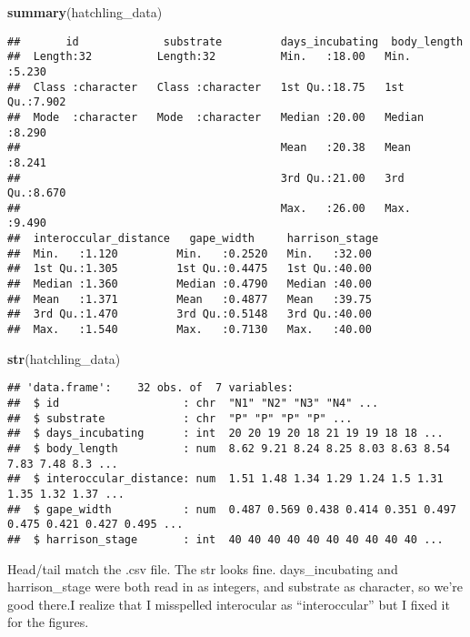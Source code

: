 \documentclass[
]{article}
\newenvironment{Shaded}{\begin{snugshade}}{\end{snugshade}}
\newcommand{\FunctionTok}[1]{\textcolor[rgb]{0.13,0.29,0.53}{\textbf{#1}}}
\newcommand{\NormalTok}[1]{#1}
\begin{document}
\begin{Shaded}
\begin{Highlighting}[]
\FunctionTok{summary}\NormalTok{(hatchling\_data)}
\end{Highlighting}
\end{Shaded}

\begin{verbatim}
##       id             substrate         days_incubating  body_length   
##  Length:32          Length:32          Min.   :18.00   Min.   :5.230  
##  Class :character   Class :character   1st Qu.:18.75   1st Qu.:7.902  
##  Mode  :character   Mode  :character   Median :20.00   Median :8.290  
##                                        Mean   :20.38   Mean   :8.241  
##                                        3rd Qu.:21.00   3rd Qu.:8.670  
##                                        Max.   :26.00   Max.   :9.490  
##  interoccular_distance   gape_width     harrison_stage 
##  Min.   :1.120         Min.   :0.2520   Min.   :32.00  
##  1st Qu.:1.305         1st Qu.:0.4475   1st Qu.:40.00  
##  Median :1.360         Median :0.4790   Median :40.00  
##  Mean   :1.371         Mean   :0.4877   Mean   :39.75  
##  3rd Qu.:1.470         3rd Qu.:0.5148   3rd Qu.:40.00  
##  Max.   :1.540         Max.   :0.7130   Max.   :40.00
\end{verbatim}

\begin{Shaded}
\begin{Highlighting}[]
\FunctionTok{str}\NormalTok{(hatchling\_data)}
\end{Highlighting}
\end{Shaded}

\begin{verbatim}
## 'data.frame':    32 obs. of  7 variables:
##  $ id                   : chr  "N1" "N2" "N3" "N4" ...
##  $ substrate            : chr  "P" "P" "P" "P" ...
##  $ days_incubating      : int  20 20 19 20 18 21 19 19 18 18 ...
##  $ body_length          : num  8.62 9.21 8.24 8.25 8.03 8.63 8.54 7.83 7.48 8.3 ...
##  $ interoccular_distance: num  1.51 1.48 1.34 1.29 1.24 1.5 1.31 1.35 1.32 1.37 ...
##  $ gape_width           : num  0.487 0.569 0.438 0.414 0.351 0.497 0.475 0.421 0.427 0.495 ...
##  $ harrison_stage       : int  40 40 40 40 40 40 40 40 40 40 ...
\end{verbatim}

Head/tail match the .csv file. The str looks fine. days\_incubating and
harrison\_stage were both read in as integers, and substrate as
character, so we're good there.I realize that I misspelled interocular
as ``interoccular'' but I fixed it for the figures.
\end{document}
